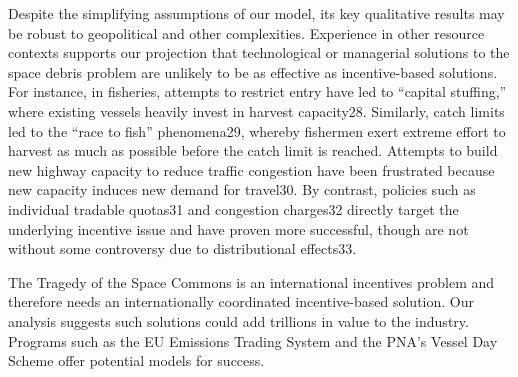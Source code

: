 \documentclass[9pt,twocolumn,twoside,lineno]{pnas-new}
\begin{document}
Despite the simplifying assumptions of our model, its key qualitative results may be robust to geopolitical and other complexities. Experience in other resource contexts supports our projection that technological or managerial solutions to the space debris problem are unlikely to be as effective as incentive-based solutions. For instance, in fisheries, attempts to restrict entry have led to “capital stuffing,” where existing vessels heavily invest in harvest capacity28. Similarly, catch limits led to the “race to fish” phenomena29, whereby fishermen exert extreme effort to harvest as much as possible before the catch limit is reached. Attempts to build new highway capacity to reduce traffic congestion have been frustrated because new capacity induces new demand for travel30. By contrast, policies such as individual tradable quotas31 and congestion charges32 directly target the underlying incentive issue and have proven more successful, though are not without some controversy due to distributional effects33.

The Tragedy of the Space Commons is an international incentives problem and therefore needs an internationally coordinated incentive-based solution. Our analysis suggests such solutions could add trillions in value to the industry. Programs such as the EU Emissions Trading System and the PNA’s Vessel Day Scheme offer potential models for success.


%
%
\end{document}
